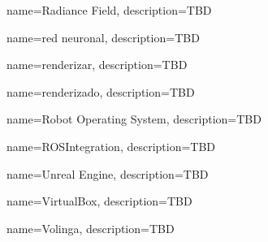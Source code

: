 



{
    name={Radiance Field},
    description={TBD}
}

{
    name={red neuronal},
    description={TBD}
}

{
    name={renderizar},
    description={TBD}
}

{
    name={renderizado},
    description={TBD}
}

{
    name={Robot Operating System},
    description={TBD}
}

{
    name={ROSIntegration},
    description={TBD}
}




{
    name={Unreal Engine},
    description={TBD}
}


{
    name={VirtualBox},
    description={TBD}
}

{
    name={Volinga},
    description={TBD}
}






